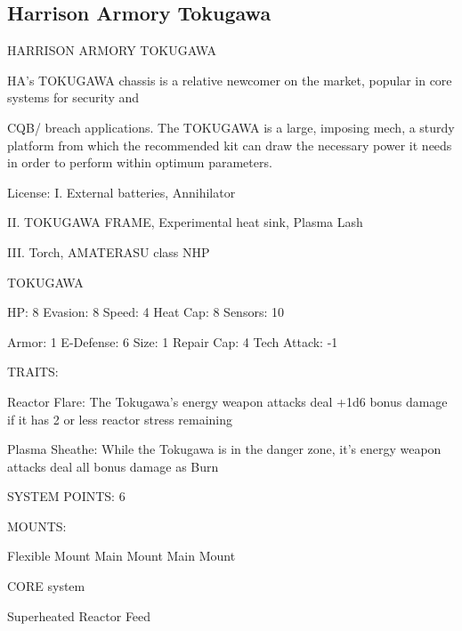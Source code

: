 \subsection{Harrison Armory Tokugawa}

                             HARRISON ARMORY TOKUGAWA  

HA’s TOKUGAWA chassis is a relative newcomer on the market, popular in core systems for security and  

CQB/ breach applications. The TOKUGAWA is a large, imposing mech, a sturdy platform from which the  
recommended kit can draw the necessary power it needs in order to perform within optimum parameters.   

                                                  License:  
I. External batteries, Annihilator
 
II. TOKUGAWA FRAME, Experimental heat sink, Plasma Lash
 
III. Torch, AMATERASU class NHP
 

                                                                                                          


                                                    TOKUGAWA 

  HP: 8            Evasion: 8                              Speed: 4             Heat Cap: 8         Sensors: 10 

  Armor: 1         E-Defense: 6                            Size: 1              Repair Cap: 4       Tech Attack: -1 

                                                        TRAITS: 

  Reactor Flare: The Tokugawa’s energy weapon attacks deal +1d6 bonus damage if it has 2 or less  
  reactor stress remaining
 
  Plasma Sheathe: While the Tokugawa is in the danger zone, it’s energy weapon attacks deal all bonus  
  damage as Burn 

                                                 SYSTEM POINTS: 6 

                                                       MOUNTS: 

  Flexible Mount                       Main Mount                               Main Mount 

                                                    CORE system 

                                             Superheated Reactor Feed  

